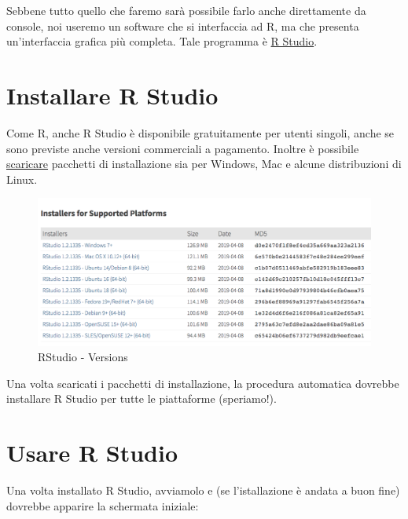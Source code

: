 \documentclass[]{book}
\begin{document}
Sebbene tutto quello che faremo sarà possibile farlo anche direttamente da console, noi useremo un software che si interfaccia ad R, ma che presenta un'interfaccia grafica più completa. Tale programma è \href{https://www.rstudio.com/products/rstudio/}{R Studio}.

\hypertarget{installare-r-studio}{%
\section{Installare R Studio}\label{installare-r-studio}}

Come R, anche R Studio è disponibile gratuitamente per utenti singoli, anche se sono previste anche versioni commerciali a pagamento. Inoltre è possibile \href{https://www.rstudio.com/products/rstudio/download2/}{scaricare} pacchetti di installazione sia per Windows, Mac e alcune distribuzioni di Linux.

\begin{figure}
\centering
\includegraphics{./media/Rstudio_Versions_2019.png}
\caption{RStudio - Versions}
\end{figure}

Una volta scaricati i pacchetti di installazione, la procedura automatica dovrebbe installare R Studio per tutte le piattaforme (speriamo!).

\hypertarget{usare-r-studio}{%
\section{Usare R Studio}\label{usare-r-studio}}

Una volta installato R Studio, avviamolo e (se l'istallazione è andata a buon fine) dovrebbe apparire la schermata iniziale:
\end{document}
